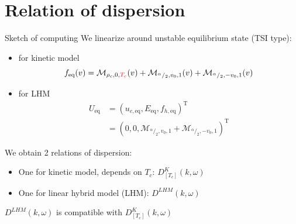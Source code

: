 \documentclass{beamer}
\newcommand{\cmark}{{\color{dgreen}\ding{52}}}
\begin{document}
\section{Relation of dispersion}
\begin{frame}{Sketch of computing}
  We linearize around unstable equilibrium state (TSI type):
  \begin{itemize}
    \item for kinetic model $$f_\text{eq}(v) = \mathcal{M}_{\rho_c,0,{\color{red}T_c}}(v) + \mathcal{M}_{^\alpha/_2,v_0,1}(v) + \mathcal{M}_{^\alpha/_2,-v_0,1}(v)$$
    \item for LHM $$
      \begin{aligned}
        U_\text{eq} &= \left(u_{c,\text{eq}},E_\text{eq},f_{h,\text{eq}}\right)^\text{T} \\
                    &= \left(0,0, \mathcal{M}_{^\alpha/_2,v_0,1} + \mathcal{M}_{^\alpha/_2,-v_0,1}\right)^\text{T}
      \end{aligned}
    $$
  \end{itemize}

  We obtain 2 relations of dispersion:
  \begin{itemize}
    \item One for kinetic model, depends on $T_c$: $D^K_{[T_c]}(k,\omega)$
    \item One for linear hybrid model (LHM): $D^{LHM}(k,\omega)$
  \end{itemize}
  $D^{LHM}(k,\omega)$ is compatible with $D^K_{[T_c]}(k,\omega)$ \cmark
\end{frame}
\end{document}
